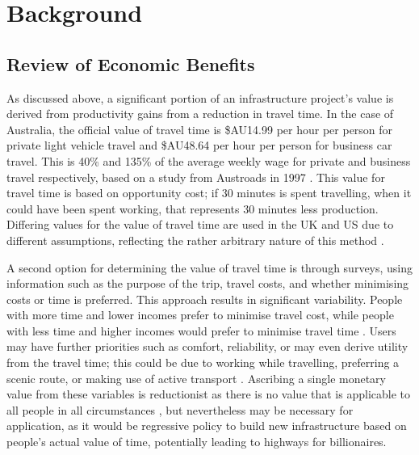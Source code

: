 \documentclass[preprint,12pt,authoryear]{elsarticle}
\begin{document}
\section{Background}
\subsection{Review of Economic Benefits}
\label{sec:economicbenefits}




{As discussed above, a significant portion of an infrastructure project's value is derived from productivity gains from a reduction in travel time. In the case of Australia}, the official value of travel time is \$AU14.99 per hour per person for private light vehicle travel and \$AU48.64 per hour per person for business car travel. This is 40\% and 135\%  of the average weekly wage for private and business travel respectively, based on a study from Austroads in 1997 \parencite{atap2024}. This value for travel time is based on opportunity cost; if 30 minutes is spent travelling, when it could have  been spent working, that represents  30 minutes less production. Differing values for the value of travel time are used in the UK and US due to different assumptions, reflecting the rather arbitrary nature of this method \parencite{itf2019,EuropeanCommission2014,FRA2016}. 

A second option for determining the value of travel time is through surveys, using information such as the purpose of the trip, travel costs, and whether minimising costs or time is preferred. This approach results in significant variability. People with more time and lower incomes prefer to minimise travel cost, while people with less time and higher incomes would prefer to minimise travel time \parencite{itf2019}. Users may have further priorities such as comfort, reliability, or may even derive utility from the travel time; this could be due to working while travelling, preferring a scenic route, or making use of active transport \parencite{goodwin2019}.  
Ascribing a single monetary value from these variables is reductionist as there is no value that is applicable to all people in all circumstances \parencite{Cherlow1981}, but nevertheless may be necessary for application, as it would be regressive policy to build new infrastructure based on people's actual value of time, potentially leading to highways for billionaires.  
\end{document}
